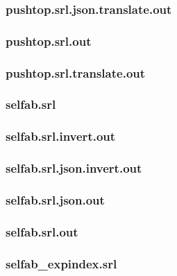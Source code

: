 \subsubsection{pushtop.srl.json.translate.out}
\label{app:pushtop_srl.json.translate.out}

\subsubsection{pushtop.srl.out}
\label{app:pushtop_srl.out}

\subsubsection{pushtop.srl.translate.out}
\label{app:pushtop_srl.translate.out}

\subsubsection{selfab.srl}
\label{app:selfab_srl}

\subsubsection{selfab.srl.invert.out}
\label{app:selfab_srl.invert.out}

\subsubsection{selfab.srl.json.invert.out}
\label{app:selfab_srl.json.invert.out}

\subsubsection{selfab.srl.json.out}
\label{app:selfab_srl.json.out}

\subsubsection{selfab.srl.out}
\label{app:selfab_srl.out}

\subsubsection{selfab\_expindex.srl}
\label{app:selfab_expindex_srl}

